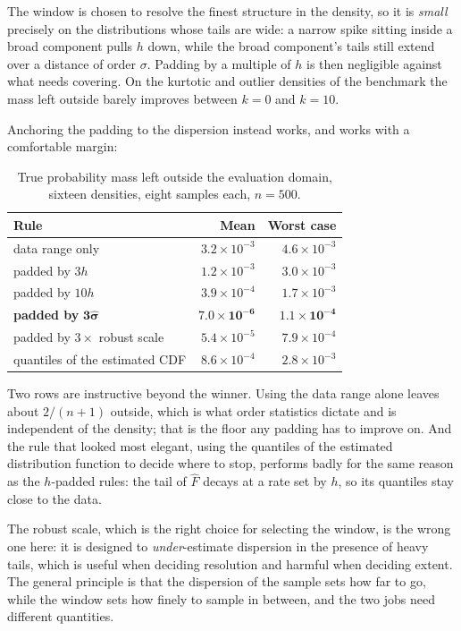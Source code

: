 \documentclass[11pt]{article}
\newcommand{\Fhat}{\widehat{F}}
\newcommand{\shat}{\hat{\sigma}}
\begin{document}
The window is chosen to resolve the finest structure in the density, so it is \emph{small}
precisely on the distributions whose tails are wide: a narrow spike sitting inside a broad
component pulls $h$ down, while the broad component's tails still extend over a distance of
order $\sigma$. Padding by a multiple of $h$ is then negligible against what needs covering.
On the kurtotic and outlier densities of the benchmark the mass left outside barely improves
between $k = 0$ and $k = 10$.

Anchoring the padding to the dispersion instead works, and works with a comfortable margin:

\begin{table}[H]
\centering
\begin{tabular}{@{}lrr@{}}
\toprule
\textbf{Rule} & \textbf{Mean} & \textbf{Worst case} \\
\midrule
data range only & $3.2 \times 10^{-3}$ & $4.6 \times 10^{-3}$ \\
padded by $3h$ & $1.2 \times 10^{-3}$ & $3.0 \times 10^{-3}$ \\
padded by $10h$ & $3.9 \times 10^{-4}$ & $1.7 \times 10^{-3}$ \\
\textbf{padded by} $\mathbf{3\shat}$ & $\mathbf{7.0 \times 10^{-6}}$ &
  $\mathbf{1.1 \times 10^{-4}}$ \\
padded by $3 \times$ robust scale & $5.4 \times 10^{-5}$ & $7.9 \times 10^{-4}$ \\
quantiles of the estimated CDF & $8.6 \times 10^{-4}$ & $2.8 \times 10^{-3}$ \\
\bottomrule
\end{tabular}
\caption{True probability mass left outside the evaluation domain, sixteen densities, eight
samples each, $n = 500$.}
\label{tab:domain}
\end{table}

Two rows are instructive beyond the winner. Using the data range alone leaves about
$2/(n+1)$ outside, which is what order statistics dictate and is independent of the density;
that is the floor any padding has to improve on. And the rule that looked most elegant, using
the quantiles of the estimated distribution function to decide where to stop, performs badly
for the same reason as the $h$-padded rules: the tail of $\Fhat$ decays at a rate set by $h$,
so its quantiles stay close to the data.

The robust scale, which is the right choice for selecting the window, is the wrong one here:
it is designed to \emph{under}-estimate dispersion in the presence of heavy tails, which is
useful when deciding resolution and harmful when deciding extent. The general principle is
that the dispersion of the sample sets how far to go, while the window sets how finely to
sample in between, and the two jobs need different quantities.
\end{document}
